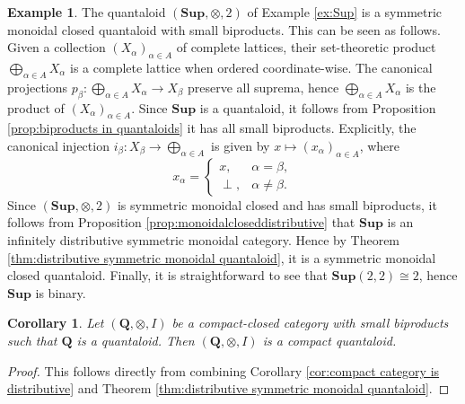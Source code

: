 \documentclass[12pt]{tac}
\newtheorem{corollary}[theorem]{Corollary}
\theoremstyle{definition}
\newtheorem{example}[theorem]{Example}
\theoremstyle{remark}
\newcommand{\<}{\langle}
\renewcommand{\>}{\rangle}
\renewcommand{\:}{\colon}
\begin{document}
\begin{example}\cite[Section 2.1]{eklund2018semigroups}\label{ex:Sup-monoidal}
The quantaloid $(\mathbf{Sup},\otimes,2)$ of Example \ref{ex:Sup} is a symmetric monoidal closed quantaloid with small biproducts. This can be seen as follows. 
Given a collection  $(X_\alpha)_{\alpha\in A}$ of complete lattices, their set-theoretic product $\bigoplus_{\alpha\in A}X_\alpha$ is a complete lattice when ordered coordinate-wise. The canonical projections $p_\beta:\bigoplus_{\alpha\in A}X_\alpha\to X_\beta$ preserve all suprema, hence $\bigoplus_{\alpha\in A}X_\alpha$ is the product of $(X_\alpha)_{\alpha\in A}$.  Since $\mathbf{Sup}$ is a quantaloid, it follows from Proposition \ref{prop:biproducts in quantaloids} it has all small biproducts. Explicitly, the canonical injection $i_\beta: X_\beta\to\bigoplus_{\alpha\in A}$ is given by $x\mapsto (x_\alpha)_{\alpha\in A}$, where
\[ x_\alpha =\begin{cases}x, & \alpha=\beta,\\
\perp, & \alpha\neq\beta. \end{cases}\]
Since $(\mathbf{Sup},\otimes,2)$ is symmetric monoidal closed and has small biproducts, it follows from Proposition \ref{prop:monoidalcloseddistributive} that $\mathbf{Sup}$ is an infinitely distributive symmetric monoidal category. Hence by Theorem \ref{thm:distributive symmetric monoidal quantaloid}, it is a symmetric monoidal closed quantaloid. Finally, it is straightforward to see that $\mathbf{Sup}(2,2)\cong 2$, hence $\mathbf{Sup}$ is binary.
\end{example}


\begin{corollary}\label{cor:compact quantaloid with biproducts is monoidal quantaloid}
Let $(\mathbf Q,\otimes,I)$ be a compact-closed category with small biproducts such that $\mathbf Q$ is a quantaloid. Then $(\mathbf Q,\otimes,I)$ is a compact quantaloid.        
\end{corollary}
\begin{proof}
    This follows directly from combining Corollary \ref{cor:compact category is distributive} and Theorem \ref{thm:distributive symmetric monoidal quantaloid}.
    \end{proof}
\end{document}
